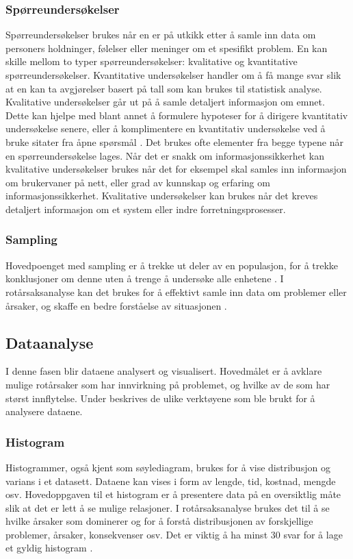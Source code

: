 \subsubsection{Spørreundersøkelser}
Spørreundersøkelser brukes når en er på utkikk etter å samle inn data om personers holdninger, følelser eller meninger om et spesifikt problem. En kan skille mellom to typer spørreundersøkelser: kvalitative og kvantitative spørreundersøkelser. Kvantitative undersøkelser handler om å få mange svar slik at en kan ta avgjørelser basert på tall som kan brukes til statistisk analyse. Kvalitative undersøkelser går ut på å samle detaljert informasjon om emnet. Dette kan hjelpe med blant annet å formulere hypoteser for å dirigere kvantitativ undersøkelse senere, eller å komplimentere en kvantitativ undersøkelse ved å bruke sitater fra åpne spørsmål \cite{KvalKvant}. Det brukes ofte elementer fra begge typene når en spørreundersøkelse lages. Når det er snakk om informasjonssikkerhet kan kvalitative undersøkelser brukes når det for eksempel skal samles inn informasjon om brukervaner på nett, eller grad av kunnskap og erfaring om informasjonssikkerhet. Kvalitative undersøkelser kan brukes når det kreves detaljert informasjon om et system eller indre forretningsprosesser. 

\subsubsection{Sampling}
Hovedpoenget med sampling er å trekke ut deler av en populasjon, for å trekke konklusjoner om denne uten å trenge å undersøke alle enhetene \cite{wiki:sample}. I rotårsaksanalyse kan det brukes for å effektivt samle inn data om problemer eller årsaker, og skaffe en bedre forståelse av situasjonen \cite{RCA}.

\subsection{Dataanalyse}
I denne fasen blir dataene analysert og visualisert. Hovedmålet er å avklare mulige rotårsaker som har innvirkning på problemet, og hvilke av de som har størst innflytelse. Under beskrives de ulike verktøyene som ble brukt for å analysere dataene.

\subsubsection{Histogram}
Histogrammer, også kjent som søylediagram, brukes for å vise distribusjon og varians i et datasett. Dataene kan vises i form av lengde, tid, kostnad, mengde osv. Hovedoppgaven til et histogram er å presentere data på en oversiktlig måte slik at det er lett å se mulige relasjoner. I rotårsaksanalyse brukes det til å se hvilke årsaker som dominerer og for å forstå distribusjonen av forskjellige problemer, årsaker, konsekvenser osv. \cite{RCA} Det er viktig å ha minst 30 svar for å lage et gyldig histogram \cite{RCA}.

